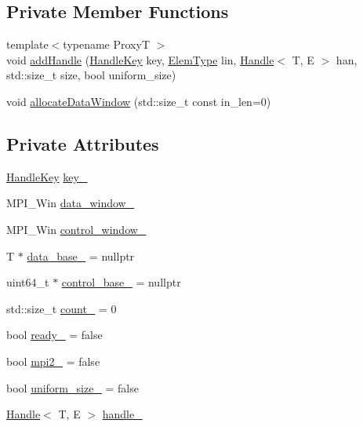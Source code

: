 \subsection*{Private Member Functions}
\begin{DoxyCompactItemize}
\item 
{\footnotesize template$<$typename ProxyT $>$ }\\void \hyperlink{structvt_1_1rdma_1_1_holder_ab5feb3bca7aad2b37c7249f3abf7ab05}{add\+Handle} (\hyperlink{structvt_1_1rdma_1_1_handle_key}{Handle\+Key} key, \hyperlink{namespacevt_1_1rdma_a38e310504e675aa1bcaf7811019b0df2}{Elem\+Type} lin, \hyperlink{structvt_1_1rdma_1_1_handle}{Handle}$<$ T, E $>$ han, std\+::size\+\_\+t size, bool uniform\+\_\+size)
\item 
void \hyperlink{structvt_1_1rdma_1_1_holder_a7dc5e735fb6f919dabec8e118683b4ae}{allocate\+Data\+Window} (std\+::size\+\_\+t const in\+\_\+len=0)
\end{DoxyCompactItemize}
\subsection*{Private Attributes}
\begin{DoxyCompactItemize}
\item 
\hyperlink{structvt_1_1rdma_1_1_handle_key}{Handle\+Key} \hyperlink{structvt_1_1rdma_1_1_holder_a32fc545bf53fbbd4002369112e5f02e0}{key\+\_\+}
\item 
M\+P\+I\+\_\+\+Win \hyperlink{structvt_1_1rdma_1_1_holder_a05f6eae32db15a58ef6cced25fde7980}{data\+\_\+window\+\_\+}
\item 
M\+P\+I\+\_\+\+Win \hyperlink{structvt_1_1rdma_1_1_holder_adfcf34183c7325a69e1ac6f550c471f1}{control\+\_\+window\+\_\+}
\item 
T $\ast$ \hyperlink{structvt_1_1rdma_1_1_holder_a347938e7cc24c482672fc73ed7be9406}{data\+\_\+base\+\_\+} = nullptr
\item 
uint64\+\_\+t $\ast$ \hyperlink{structvt_1_1rdma_1_1_holder_a4f9ee10b09fb58524ac3659f180a4a96}{control\+\_\+base\+\_\+} = nullptr
\item 
std\+::size\+\_\+t \hyperlink{structvt_1_1rdma_1_1_holder_adba61a40f9dd80d86ac7d0d82d415923}{count\+\_\+} = 0
\item 
bool \hyperlink{structvt_1_1rdma_1_1_holder_ad61ee11705da8cf0ba8664b3173e7370}{ready\+\_\+} = false
\item 
bool \hyperlink{structvt_1_1rdma_1_1_holder_aecfc6828df1f361fa24e2780b07b6d56}{mpi2\+\_\+} = false
\item 
bool \hyperlink{structvt_1_1rdma_1_1_holder_a6c137c841a55e053778597860c6761e8}{uniform\+\_\+size\+\_\+} = false
\item 
\hyperlink{structvt_1_1rdma_1_1_handle}{Handle}$<$ T, E $>$ \hyperlink{structvt_1_1rdma_1_1_holder_a0995b9b9adfce492d7d3dead1ed8ac7a}{handle\+\_\+}
\end{DoxyCompactItemize}
